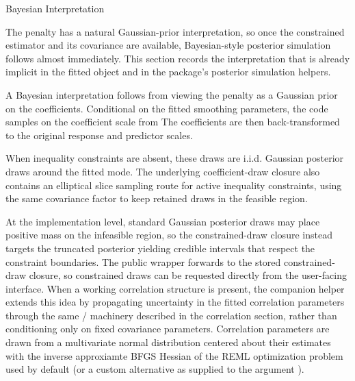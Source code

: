 \begin{Section}{Bayesian Interpretation}


The penalty has a natural Gaussian-prior interpretation, so once the
constrained estimator and its covariance are available, Bayesian-style
posterior simulation follows almost immediately. This section records the
interpretation that is already implicit in the fitted object and in the
package's posterior simulation helpers.

A Bayesian interpretation follows from viewing the penalty as a Gaussian
prior on the coefficients. Conditional on the fitted smoothing parameters,
the code samples on the coefficient scale from
The coefficients are then back-transformed to the original response and
predictor scales.

When inequality constraints are absent, these draws are i.i.d. Gaussian
posterior draws around the fitted mode.
The underlying coefficient-draw closure also contains an elliptical slice
sampling route for active inequality constraints, using the same covariance
factor to keep retained draws in the feasible region.

At the implementation level, standard Gaussian posterior draws may place
positive mass on the infeasible region, so the constrained-draw closure
instead targets the truncated posterior
yielding credible intervals that respect the constraint boundaries.
The public  wrapper forwards
 to the stored constrained-draw closure, so
constrained draws can be requested directly from the user-facing interface.
When a working correlation structure is present, the companion helper
 extends this idea by propagating
uncertainty in the fitted correlation parameters through the same
/ machinery described in the correlation
section, rather than conditioning only on fixed covariance parameters. Correlation
parameters are drawn from a multivariate normal distribution centered about their estimates
with the inverse approxiamte BFGS Hessian of the REML optimization problem
 used by default (or a custom alternative as
supplied to the argument ).
\end{Section}
